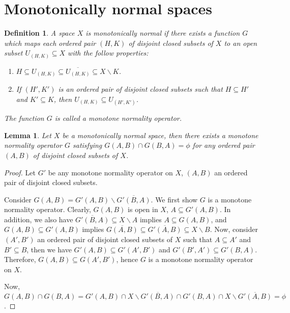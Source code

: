 \documentclass[12pt,oneside,english]{amsbook}
\numberwithin{equation}{section} %
\numberwithin{figure}{section} %
\theoremstyle{plain}
\numberwithin{section}{chapter}
\theoremstyle{plain}
\newtheorem{lem}[thm]{Lemma}
\newtheorem{defn}[thm]{Definition}
\begin{document}
\section{Monotonically normal spaces}

\begin{defn}
  A space $X$ is monotonically normal if there exists a function $G$ which maps each ordered pair $(H,K)$ of disjoint closed subsets of $X$ to an open subset $U_{(H,K)} \subseteq X$ with the follow properties:
  \begin{enumerate}
  \item $H \subseteq U_{(H,K)} \subseteq \overline{U_{(H,K)}} \subseteq X \backslash K$.
  \item If $(H',K')$ is an ordered pair of disjoint closed subsets such that $H \subseteq H'$ and $K' \subseteq K$, then $U_{(H,K)} \subseteq U_{(H',K')}$.
  \end{enumerate}
The function $G$ is called a monotone normality operator.
\end{defn}

\begin{lem} \label{lem:mononormal:1}
  Let $X$ be a monotonically normal space, then there exists a monotone normality operator $G$ satisfying $G(A,B) \cap G(B,A) = \phi$ for any ordered pair $(A,B)$ of disjoint closed subsets of $X$.
\end{lem}
\begin{proof}
  Let $G'$ be any monotone normality operator on $X$, $(A,B)$ an ordered pair of disjoint closed subsets.

  Consider $G(A,B) = G'(A,B) \backslash \overline{G'(B,A)}$. We first show $G$ is a monotone normality operator. Clearly, $G(A,B)$ is open in $X$, $A \subseteq G'(A,B)$. In addition, we also have $\overline{G'(B,A)} \subseteq X \backslash A$ implies $A \subseteq G(A,B)$, and $G(A,B) \subseteq G'(A,B)$ implies $\overline{G(A,B)} \subseteq \overline{G'(A,B)} \subseteq X \backslash B$. Now, consider $(A',B')$ an ordered pair of disjoint closed subsets of $X$ such that $A \subseteq A'$ and $B' \subseteq B$, then we have $G'(A,B) \subseteq G'(A',B')$ and $G'(B',A') \subseteq G'(B,A)$. Therefore, $G(A,B) \subseteq G(A',B')$, hence $G$ is a monotone normality operator on $X$.

  Now, $G(A,B) \cap G(B,A) = G'(A,B) \cap X \backslash \overline{G'(B,A)} \cap G'(B,A) \cap X \backslash \overline{G'(A,B)} = \phi$.
\end{proof}
\end{document}
